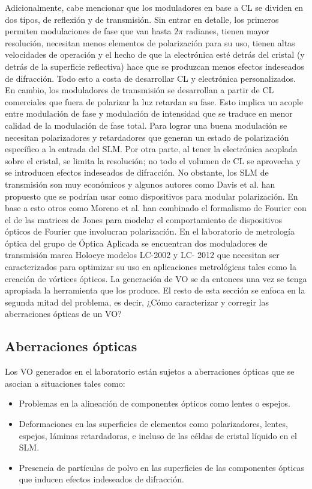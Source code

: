 Adicionalmente, cabe mencionar que los moduladores en base a CL se
dividen en dos tipos, de reflexión y de transmisión. Sin entrar en
detalle, los primeros permiten modulaciones de fase que van hasta $2\pi$
radianes, tienen mayor resolución, necesitan menos elementos de
polarización para su uso, tienen altas velocidades de operación y el
hecho de que la electrónica esté detrás del cristal (y detrás de la
superficie reflectiva) hace que se produzcan menos efectos indeseados
de difracción. Todo esto a costa de desarrollar CL y
electrónica personalizados. En cambio, los moduladores de transmisión
se desarrollan a partir de CL comerciales que fuera de polarizar la luz
retardan su fase. Esto implica un acople entre modulación de fase y 
modulación de intensidad que se traduce en menor calidad de la
modulación de fase total. Para lograr una buena
modulación se necesitan polarizadores y retardadores que generan un
estado de polarización específico a la entrada del SLM. Por otra
parte, al tener la electrónica acoplada sobre el cristal, se limita la
resolución; no todo el volumen de CL se aprovecha y se introducen
efectos indeseados de difracción. 
No obstante, los SLM de transmisión son muy económicos y algunos
autores como Davis et al.  han propuesto
que se podrían usar como dispositivos para modular polarización. En
base a esto otros como Moreno et al.  han
combinado el formalismo de Fourier con el de las matrices de Jones
para modelar el comportamiento de dispositivos ópticos de Fourier que
involucran polarización. 
En el laboratorio de metrología óptica del grupo de Óptica Aplicada se
encuentran dos moduladores de transmisión marca Holoeye modelos
LC-2002 y LC- 2012 que necesitan ser caracterizados para optimizar su
uso en aplicaciones metrológicas tales como la creación de vórtices
ópticos. 
La generación de VO se da entonces una vez se tenga apropiada la
herramienta que los produce. El resto de esta sección se enfoca en la
segunda mitad del problema, es decir, ¿Cómo caracterizar y corregir las
aberraciones ópticas de un VO?

\subsection{Aberraciones ópticas}

Los VO generados en el laboratorio están sujetos a aberraciones
ópticas que se asocian a situaciones tales como:
\begin{itemize}
\item Problemas en la alineación de componentes ópticos como
  lentes o espejos.
\item Deformaciones en las superficies de elementos como
  polarizadores, lentes, espejos, láminas retardadoras, e incluso de
  las céldas de cristal líquido en el SLM.
\item Presencia de partículas de polvo en las superficies de las
  componentes ópticas que inducen efectos indeseados de difracción. 
\end{itemize}


